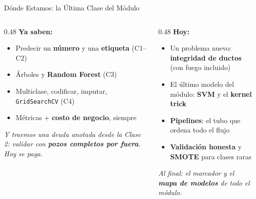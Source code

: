 \documentclass[aspectratio=169, 11pt]{beamer}
\begin{document}
\begin{frame}[shrink=8]{Dónde Estamos: la Última Clase del Módulo}
  \vspace{-4pt}
  \begin{columns}[T]
    \begin{column}{0.48\textwidth}
      {\small\color{arcaDark}\bfseries\faCheckCircle\hspace{5pt}Ya saben:}
      \vspace{4pt}
      {\footnotesize\color{textMuted}
      \begin{itemize}\setlength{\itemsep}{3pt}
        \item[{\color{codeGreen}\scriptsize\faCheck}]
          Predecir un \textbf{número} y una \textbf{etiqueta} (C1--C2)
        \item[{\color{codeGreen}\scriptsize\faCheck}]
          Árboles y \textbf{Random Forest} (C3)
        \item[{\color{codeGreen}\scriptsize\faCheck}]
          Multiclase, codificar, imputar, \texttt{GridSearchCV} (C4)
        \item[{\color{codeGreen}\scriptsize\faCheck}]
          Métricas + \textbf{costo de negocio}, siempre
      \end{itemize}
      }
      \vspace{6pt}
      {\scriptsize\color{textMuted}\itshape
        Y traemos una deuda anotada desde la Clase 2:
        validar con \textbf{pozos completos por fuera}. Hoy se paga.}
    \end{column}
    \begin{column}{0.48\textwidth}
      {\small\color{arcaDark}\bfseries\faForward\hspace{5pt}Hoy:}
      \vspace{4pt}
      {\footnotesize\color{textMuted}
      \begin{itemize}\setlength{\itemsep}{3pt}
        \item[{\color{arcaRed}\scriptsize\faArrowRight}]
          Un problema nuevo: \textbf{integridad de ductos} (con fuego incluido)
        \item[{\color{arcaRed}\scriptsize\faArrowRight}]
          El último modelo del módulo: \textbf{SVM} y el \textbf{kernel trick}
        \item[{\color{arcaRed}\scriptsize\faArrowRight}]
          \textbf{Pipelines}: el tubo que ordena todo el flujo
        \item[{\color{arcaRed}\scriptsize\faStar}]
          \textbf{Validación honesta} y \textbf{SMOTE} para clases raras
      \end{itemize}
      }
      \vspace{4pt}
      {\scriptsize\color{arcaDark}\itshape
        Al final: el marcador y el \textbf{mapa de modelos}
        de todo el módulo.}
    \end{column}
  \end{columns}
\end{frame}
\end{document}
